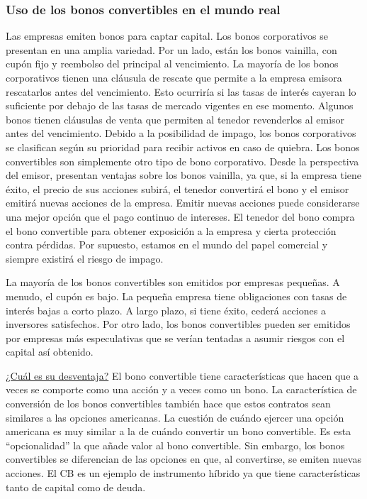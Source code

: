 \subsubsection{Uso de los bonos convertibles en el mundo real}
Las empresas emiten bonos para captar capital. Los bonos corporativos se presentan en una amplia variedad. Por un lado, están los bonos vainilla, con cupón fijo y reembolso del principal al vencimiento. La mayoría de los bonos corporativos tienen una cláusula de rescate que permite a la empresa emisora rescatarlos antes del vencimiento. Esto ocurriría si las tasas de interés cayeran lo suficiente por debajo de las tasas de mercado vigentes en ese momento. Algunos bonos tienen cláusulas de venta que permiten al tenedor revenderlos al emisor antes del vencimiento. Debido a la posibilidad de impago, los bonos corporativos se clasifican según su prioridad para recibir activos en caso de quiebra. Los bonos convertibles son simplemente otro tipo de bono corporativo. Desde la perspectiva del emisor, presentan ventajas sobre los bonos vainilla, ya que, si la empresa tiene éxito, el precio de sus acciones subirá, el tenedor convertirá el bono y el emisor emitirá nuevas acciones de la empresa. Emitir nuevas acciones puede considerarse una mejor opción que el pago continuo de intereses. El tenedor del bono compra el bono convertible para obtener exposición a la empresa y cierta protección contra pérdidas. Por supuesto, estamos en el mundo del papel comercial y siempre existirá el riesgo de impago.

La mayoría de los bonos convertibles son emitidos por empresas pequeñas. A menudo, el cupón es bajo. La pequeña empresa tiene obligaciones con tasas de interés bajas a corto plazo. A largo plazo, si tiene éxito, cederá acciones a inversores satisfechos. Por otro lado, los bonos convertibles pueden ser emitidos por empresas más especulativas que se verían tentadas a asumir riesgos con el capital así obtenido.

\underline{¿Cuál es su desventaja?}
El bono convertible tiene características que hacen que a veces se comporte como una acción y a veces como un bono. La característica de conversión de los bonos convertibles también hace que estos contratos sean similares a las opciones americanas. La cuestión de cuándo ejercer una opción americana es muy similar a la de cuándo convertir un bono convertible. Es esta ``opcionalidad'' la que añade valor al bono convertible. Sin embargo, los bonos convertibles se diferencian de las opciones en que, al convertirse, se emiten nuevas acciones. El CB es un ejemplo de instrumento híbrido ya que tiene características tanto de capital como de deuda.

